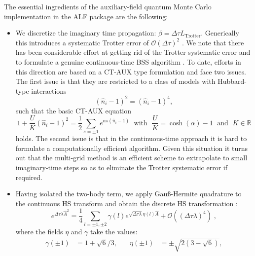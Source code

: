 The essential ingredients of the auxiliary-field quantum Monte Carlo implementation in the ALF package are the following:
\begin{itemize}
\item  We discretize the imaginary time propagation: $\beta = \Delta \tau L_{\text{Trotter}} $. Generically this introduces a systematic Trotter error of $\mathcal{O}(\Delta \tau)^2$  \cite{Fye86}. 
We note that there has been considerable effort at getting rid of the Trotter systematic error and to formulate a genuine continuous-time BSS  algorithm \cite{Iazzi15}.   To date, efforts in this direction are based on a CT-AUX type formulation \cite{Rombouts99,Gull08} and   face  two issues. The first issue is that they are restricted to a class of models with Hubbard-type interactions
\begin{equation}
        \left(  \hat{n}_{i}- 1\right)^{2}  = \left(  \hat{n}_{i}- 1\right)^{4} ,
\end{equation}
such that  the  basic CT-AUX equation \cite{Rombouts98}
\begin{equation}
          1   + \frac{U}{K} \left(  \hat{n}_{i}- 1\right)^{2}    = \frac{1}{2}\sum_{s=\pm 1}   e^{ \alpha s \left(  \hat{n}_{i}- 1\right) }  \; \text{ with  }  \;  \frac{U}{K} = \cosh(\alpha) -1 \; \text{ and  }  \; K\in\mathbb{R}
\end{equation}
holds.
The second issue is that in the continuous-time  approach it is hard to formulate a  computationally efficient algorithm.  Given this situation it turns out that the multi-grid method \cite{Rost12,Rost13,Bluemer08}  is an efficient  scheme to   extrapolate to  small imaginary-time steps so as to  eliminate the Trotter systematic error if required.
\item  Having isolated the two-body term, we apply Gau\ss{}-Hermite quadrature \cite{goth2020} to the 
continuous HS transform and obtain the discrete HS transformation \cite{Motome97,Assaad97}:
\begin{equation}
\label{HS_squares}
        e^{\Delta \tau  \lambda  \hat{A}^2 } = \frac{1}{4}
        \sum_{ l = \pm 1, \pm 2}  \gamma(l)
e^{ \sqrt{\Delta \tau \lambda }
       \eta(l)  \hat{A} }
                + \mathcal{O} \left(  (\Delta \tau \lambda)^4\right) \;,
\end{equation}
where the fields $\eta$ and $\gamma$ take the values:
\begin{equation} \label{eta_gamma_fields}
\begin{aligned}
\gamma(\pm 1) &= 1 + \sqrt{6}/3, \quad & \eta(\pm 1 ) &= \pm \sqrt{2 \left(3 - \sqrt{6} \right)},\\

\end{aligned}
\end{equation}
\end{itemize}

